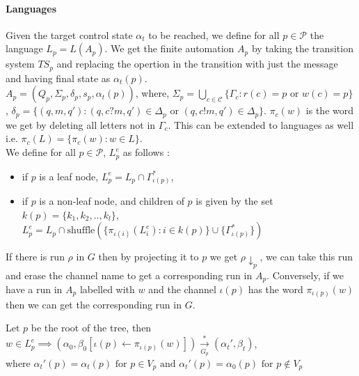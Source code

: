 \documentclass[a4paper,UKenglish,cleveref, autoref, thm-restate]{lipics-v2019}
\begin{document}
\paragraph*{Languages}

\hspace*{0.5cm}Given the target control state $\alpha_t$  to be reached, we define for all $p \in \mathcal{P}$ the language $L_p = L(A_p)$. We get the finite automation $A_p$ by taking the transition system $TS_p$ and replacing the opertion in the transition with just the message and having final state as $\alpha_t(p)$. \\
\hspace{5cm} $A_p= (Q_p, \Sigma_p, \delta_p, s_p, \alpha_t(p))$, 
where, $\Sigma_p = \bigcup\limits_{c \in \mathcal{C}} \{ \Gamma_c : r(c) = p \text{ or } w(c) = p\}$ , $\delta_p = \{(q, m, q') : (q, c?m, q') \in \Delta_p \text{ or } (q, c!m, q') \in \Delta_p\}$. $\pi_c(w)$ is the word we get by deleting all letters not in $\Gamma_c$. This can be extended to languages as well i.e. $\pi_c(L) = \{ \pi_c(w) : w \in L\}$.\\
\hspace*{0.5cm}We define for all $p \in \mathcal{P}$, $L_p^e$ as follows : 
\begin{itemize}
    \item if $p$ is a leaf node, $L_p^e = L_p \cap \Gamma_{\iota(p)}^*$,
    \item if $p$ is a non-leaf node, and children of $p$ is given by the set $k(p) = \{k_1, k_2, .., k_l\}$, $L_p^e = L_p \cap \text{shuffle}(\{ \pi_{\iota(i)}(L_i^e)  : i \in k(p)\} \cup \{\Gamma_{\iota(p)}^*\})$
\end{itemize}
\hspace*{0.5cm}If there is run $\rho$ in $G$ then by projecting it to $p$ we get $\rho \downarrow_p$, we can take this run and erase the channel name to get a corresponding run in $A_p$. Conversely, if we have a run in $A_p$ labelled with $w$ and the channel $\iota(p)$ has the word $\pi_{\iota(p)}(w)$ then we can get the corresponding run in $G$.
    



\begin{lemma}\label{testenv-lemma}

Let $p$ be the root of the tree, then \\
\hspace*{2cm}$w \in L_p^e \implies (\alpha_0, \beta_0[\iota(p) \leftarrow \pi_{\iota(p)}(w) ]) \xrightarrow[G_p]{*} (\alpha_t', \beta_t)$, \\
where $\alpha_t'(p) = \alpha_t(p) \text{ for } p \in V_p  \text{ and } \alpha_t'(p) = \alpha_0(p) \text{ for } p \notin V_p$
\end{lemma}
   
\end{document}

